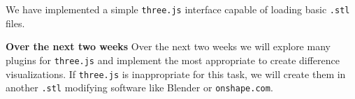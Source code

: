 \documentclass[sigconf,authorversion,nonacm]{acmart}
\begin{document}
We have implemented a simple \texttt{three.js} interface capable of loading basic \texttt{.stl} files.

\textbf{Over the next two weeks} Over the next two weeks we will explore many plugins for \texttt{three.js} and implement the most appropriate to create difference visualizations. If \texttt{three.js} is inappropriate for this task, we will create them in another \texttt{.stl} modifying software like Blender or \texttt{onshape.com}.


\end{document}
